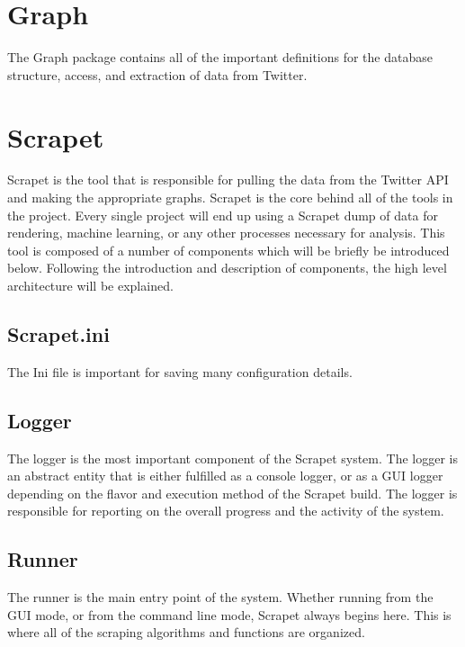 \section{Graph}
The Graph package contains all of the important definitions for the database structure, access, and extraction of data from Twitter.

\section{Scrapet}
Scrapet is the tool that is responsible for pulling the data from the Twitter API and making the appropriate graphs. Scrapet is the core behind all of the tools in the project. Every single project will end up using a Scrapet dump of data for rendering, machine learning, or any other processes necessary for analysis. This tool is composed of a number of components which will be briefly be introduced below. Following the introduction and description of components, the high level architecture will be explained.

\subsection{Scrapet.ini}
The Ini file is important for saving many configuration details.

\subsection{Logger}
The logger is the most important component of the Scrapet system. The logger is an abstract entity that is either fulfilled as a console logger, or as a GUI logger depending on the flavor and execution method of the Scrapet build. The logger is responsible for reporting on the overall progress and the activity of the system.

\subsection{Runner}
The runner is the main entry point of the system. Whether running from the GUI mode, or from the command line mode, Scrapet always begins here. This is where all of the scraping algorithms and functions are organized.

